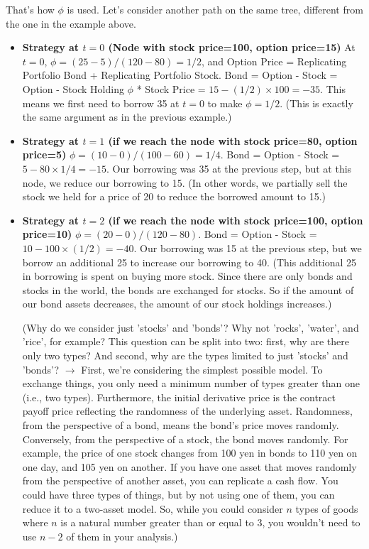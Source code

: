 \documentclass[uplatex,a4j,12pt,dvipdfmx]{jsarticle}
\begin{document}
That's how $\phi$ is used. Let's consider another path on the same tree, different from the one in the example above.

\begin{itemize}
	\item \textbf{Strategy at $t=0$ (Node with stock price=100, option price=15)}
	At $t=0$, $\phi = (25-5)/(120-80)=1/2$, and Option Price = Replicating Portfolio Bond + Replicating Portfolio Stock. Bond = Option - Stock = Option - Stock Holding $\phi$ * Stock Price = $15 - (1/2) \times 100 = -35$. This means we first need to borrow 35 at $t=0$ to make $\phi=1/2$. (This is exactly the same argument as in the previous example.)

	\item \textbf{Strategy at $t=1$ (if we reach the node with stock price=80, option price=5)}
	$\phi = (10-0)/(100-60)=1/4$. Bond = Option - Stock = $5-80 \times 1/4 = -15$. Our borrowing was 35 at the previous step, but at this node, we reduce our borrowing to 15. (In other words, we partially sell the stock we held for a price of 20 to reduce the borrowed amount to 15.)

	\item \textbf{Strategy at $t=2$ (if we reach the node with stock price=100, option price=10)}
	$\phi = (20-0)/(120-80)$. Bond = Option - Stock = $10-100 \times (1/2) = -40$. Our borrowing was 15 at the previous step, but we borrow an additional 25 to increase our borrowing to 40. (This additional 25 in borrowing is spent on buying more stock. Since there are only bonds and stocks in the world, the bonds are exchanged for stocks. So if the amount of our bond assets decreases, the amount of our stock holdings increases.)

	(Why do we consider just 'stocks' and 'bonds'? Why not 'rocks', 'water', and 'rice', for example? This question can be split into two: first, why are there only two types? And second, why are the types limited to just 'stocks' and 'bonds'? $\to$ First, we're considering the simplest possible model. To exchange things, you only need a minimum number of types greater than one (i.e., two types). Furthermore, the initial derivative price is the contract payoff price reflecting the randomness of the underlying asset. Randomness, from the perspective of a bond, means the bond's price moves randomly. Conversely, from the perspective of a stock, the bond moves randomly. For example, the price of one stock changes from 100 yen in bonds to 110 yen on one day, and 105 yen on another. If you have one asset that moves randomly from the perspective of another asset, you can replicate a cash flow. You could have three types of things, but by not using one of them, you can reduce it to a two-asset model. So, while you could consider $n$ types of goods where $n$ is a natural number greater than or equal to 3, you wouldn't need to use $n-2$ of them in your analysis.)


\end{itemize}
\end{document}
